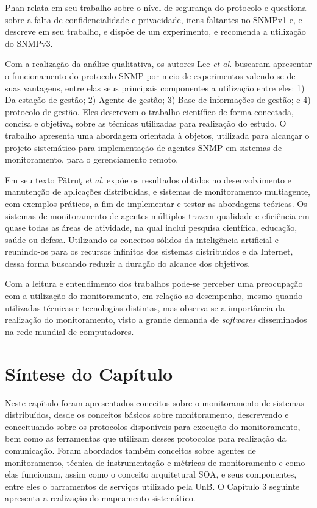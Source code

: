 Phan \cite{phan2009cryptanalysis} relata em seu trabalho sobre o nível de segurança do protocolo e questiona sobre a falta de confidencialidade e privacidade, itens faltantes no SNMPv1 e, e descreve em seu trabalho, e dispõe de um experimento, e recomenda a utilização do SNMPv3.

Com a realização da análise qualitativa, os autores Lee \textit{et al.} \cite{lee2004design} buscaram apresentar o funcionamento do protocolo SNMP por meio de experimentos valendo-se de suas vantagens, entre elas seus principais componentes a utilização entre eles: 1) Da estação de gestão; 2) Agente de gestão; 3) Base de informações de gestão; e 4) protocolo de gestão. Eles descrevem o trabalho científico de forma conectada, concisa e objetiva, sobre as técnicas utilizadas para realização do estudo. O trabalho apresenta uma abordagem orientada à objetos, utilizada para alcançar o projeto sistemático para implementação de agentes SNMP em sistemas de monitoramento, para o gerenciamento remoto.

Em seu texto Pătruţ \textit{et al.} \cite{puatruct2010agent} expõe os resultados obtidos no desenvolvimento e manutenção de aplicações distribuídas, e sistemas de monitoramento multiagente, com exemplos práticos, a fim de implementar e testar as abordagens teóricas. Os sistemas de monitoramento de agentes múltiplos trazem qualidade e eficiência em quase todas as áreas de atividade, na qual inclui pesquisa científica, educação, saúde ou defesa.
Utilizando os conceitos sólidos da inteligência artificial e reunindo-os para os recursos infinitos dos sistemas distribuídos e da Internet, dessa forma buscando reduzir a duração do alcance dos objetivos.

Com a leitura e entendimento dos trabalhos pode-se perceber uma preocupação com a utilização do monitoramento, em relação ao desempenho, mesmo quando utilizadas técnicas e tecnologias distintas, mas observa-se a importância da realização do monitoramento, visto a grande demanda de \textit{softwares} disseminados na rede mundial de computadores.


\section{Síntese do Capítulo}

Neste capítulo foram apresentados conceitos sobre o monitoramento de sistemas distribuídos, desde os conceitos básicos sobre monitoramento, descrevendo e conceituando sobre os protocolos disponíveis para execução do monitoramento, bem como as ferramentas que utilizam desses protocolos para realização da comunicação. Foram abordados também conceitos sobre agentes de monitoramento, técnica  de instrumentação e métricas de monitoramento e como elas funcionam, assim como o conceito arquitetural \acrshort{SOA}, e seus componentes, entre eles o barramentos de serviços utilizado pela \acrshort{UnB}. O Capítulo 3 seguinte apresenta a realização do mapeamento sistemático.


